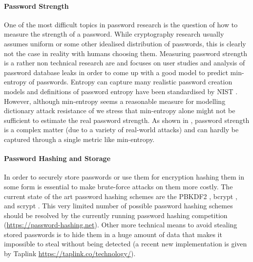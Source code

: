 \paragraph{Password Strength}
One of the most difficult topics in password research is the question of how to measure the strength of a password.
While cryptography research usually assumes uniform or some other idealised distribution of passwords, this is clearly not the case in reality with humans choosing them.
Measuring password strength is a rather non technical research are and focuses on user studies and analysis of password database leaks \cite{ShayKKLMBCC10,KomanduriSKMBCCE11,MazurekKVBCCKSU13} in order to come up with a good model to predict min-entropy of passwords.
Entropy can capture many realistic password creation models and definitions of password entropy have been standardised by NIST \cite{nist800}.
However, although min-entropy seems a reasonable measure for modelling dictionary attack resistance of we stress that min-entropy alone might not be sufficient to estimate the real password strength. 
As shown in \cite{MazurekKVBCCKSU13}, password strength is a complex matter (due to a variety of real-world attacks) and can hardly be captured through a single metric like min-entropy.

\paragraph{Password Hashing and Storage}
In order to securely store passwords or use them for encryption hashing them in some form is essential to make brute-force attacks on them more costly.
The current state of the art password hashing schemes are the \ac{PBKDF2} \cite{rfc2898}, bcrypt \cite{ProvosM99}, and scrypt \cite{rfcScrypt}.
This very limited number of possible password hashing schemes should be resolved by the currently running password hashing competition (\url{https://password-hashing.net}).
Other more technical means to avoid stealing stored passwords is to hide them in a huge amount of data that makes it impossible to steal without being detected (a recent new implementation is given by Taplink \url{https://taplink.co/technology/}).


